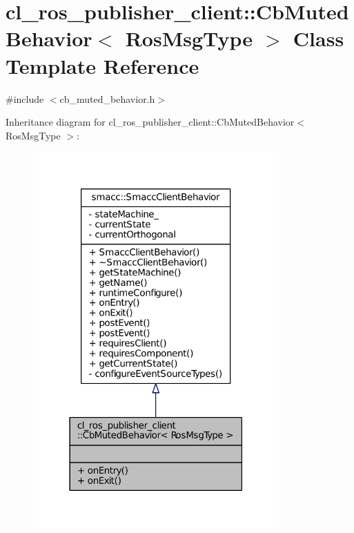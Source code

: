 \hypertarget{classcl__ros__publisher__client_1_1CbMutedBehavior}{}\section{cl\+\_\+ros\+\_\+publisher\+\_\+client\+:\+:Cb\+Muted\+Behavior$<$ Ros\+Msg\+Type $>$ Class Template Reference}
\label{classcl__ros__publisher__client_1_1CbMutedBehavior}


{\ttfamily \#include $<$cb\+\_\+muted\+\_\+behavior.\+h$>$}



Inheritance diagram for cl\+\_\+ros\+\_\+publisher\+\_\+client\+:\+:Cb\+Muted\+Behavior$<$ Ros\+Msg\+Type $>$\+:
\nopagebreak
\begin{figure}[H]
\begin{center}
\leavevmode
\includegraphics[width=267pt]{classcl__ros__publisher__client_1_1CbMutedBehavior__inherit__graph}
\end{center}
\end{figure}


